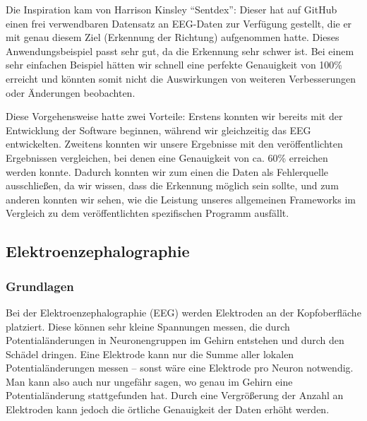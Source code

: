\documentclass[10pt]{article}
\begin{document}
Die Inspiration kam von Harrison Kinsley \enquote{Sentdex}: Dieser hat auf GitHub einen frei verwendbaren Datensatz an EEG-Daten zur Verfügung gestellt, die er mit genau diesem Ziel (Erkennung der Richtung) aufgenommen hatte. \cite{Sentdex}
Dieses Anwendungsbeispiel passt sehr gut, da die Erkennung sehr schwer ist.
Bei einem sehr einfachen Beispiel hätten wir schnell eine perfekte Genauigkeit von 100\% erreicht und könnten somit nicht die Auswirkungen von weiteren Verbesserungen oder Änderungen beobachten.

Diese Vorgehensweise hatte zwei Vorteile:
Erstens konnten wir
bereits mit der Entwicklung der Software beginnen, während wir gleichzeitig das EEG entwickelten.
Zweitens konnten wir unsere Ergebnisse mit den veröffentlichten Ergebnissen vergleichen,
bei denen eine Genauigkeit von ca. 60\% erreichen werden konnte.
Dadurch konnten wir zum einen die Daten als Fehlerquelle ausschließen, da wir wissen, dass die Erkennung möglich sein sollte, und zum anderen konnten wir sehen, wie die Leistung unseres allgemeinen Frameworks im Vergleich zu dem veröffentlichten spezifischen Programm ausfällt. 



\subsection{Elektroenzephalographie}

\subsubsection{Grundlagen} 
Bei der Elektroenzephalographie (EEG) werden Elektroden an der Kopfoberfläche platziert. 
Diese können sehr kleine Spannungen messen, die durch Potentialänderungen in Neuronengruppen im Gehirn entstehen und durch den Schädel dringen. 
Eine Elektrode kann nur die Summe aller lokalen Potentialänderungen messen -- sonst wäre eine Elektrode pro Neuron notwendig. 
Man kann also auch nur ungefähr sagen, wo genau im Gehirn eine Potentialänderung stattgefunden hat.
Durch eine Vergrößerung der Anzahl an Elektroden kann jedoch die örtliche Genauigkeit der Daten erhöht werden.
\end{document}
